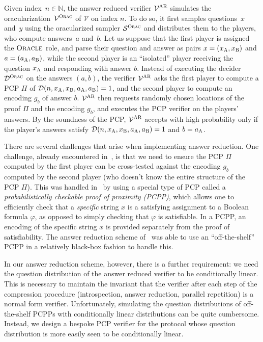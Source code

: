\documentclass[11pt]{article}
\theoremstyle{definition}
\newcommand{\N}{\ensuremath{\mathbb{N}}}
\newcommand{\sampler}{\mathcal{S}}
\newcommand{\decider}{\mathcal{D}}
\newcommand{\verifier}{\mathcal{V}}
\newcommand{\gamestyle}[1]{\ensuremath{\textsc{#1}}\xspace}
\newcommand{\ora}{\gamestyle{Orac}}
\newcommand{\ar}{\gamestyle{AR}}
\newcommand{\labelstyle}[1]{\ensuremath{\textsc{#1}}\xspace}
\newcommand{\alice}{\labelstyle{A}}
\newcommand{\bob}{\labelstyle{B}}
\newcommand{\oracle}{\labelstyle{Oracle}}
\begin{document}
Given index~$n \in \N$, the answer reduced verifier $\verifier^\ar$ simulates
the oracularization~$\verifier^\ora$ of $\verifier$ on index $n$.
To do so, it first samples questions~$x$ and~$y$ using the oracularized sampler
$\sampler^\ora$ and distributes them to the players, who compute answers~$a$
and~$b$.
Let us suppose that the first player is assigned the $\oracle$ role, and parse
their question and answer as pairs $x = (x_\alice, x_\bob)$ and $a = (a_\alice,
a_\bob)$, while the second player is an ``isolated'' player receiving the
question $x_\alice$ and responding with answer $b$.
Instead of executing the decider $\decider^\ora$ on the answers $(a, b)$, the
verifier $\verifier^\ar$ asks the first player to compute a PCP $\Pi$ of
$\decider(n, x_\alice, x_\bob, a_\alice, a_\bob) = 1$, and the second player to
compute an encoding $g_b$ of answer $b$.
$\verifier^\ar$ then requests randomly chosen locations of the proof $\Pi$ and
the encoding $g_b$, and executes the PCP verifier on the players' answers.
By the soundness of the PCP, $\verifier^\ar$ accepts with high probability only
if the player's answers satisfy $\decider(n, x_\alice, x_\bob, a_\alice, a_\bob)
= 1$ and $b = a_\alice$.

There are several challenges that arise when implementing answer reduction.
One challenge, already encountered in~\cite{NW19}, is that we need to ensure the
PCP $\Pi$ computed by the first player can be cross-tested against the encoding
$g_b$ computed by the second player (who doesn't know the entire structure of
the PCP $\Pi$).
This was handled in~\cite{NW19} by using a special type of PCP called a
\emph{probabilistically checkable proof of proximity (PCPP)}, which allows one
to efficiently check that a \emph{specific} string $x$ is a satisfying
assignment to a Boolean formula $\varphi$, as opposed to simply checking that
$\varphi$ is satisfiable.
In a PCPP, an encoding of the specific string $x$ is provided separately from
the proof of satisfiability.
The answer reduction scheme of~\cite{NW19} was able to use an ``off-the-shelf''
PCPP in a relatively black-box fashion to handle this.

In our answer reduction scheme, however, there is a further requirement: we need
the question distribution of the answer reduced verifier to be conditionally
linear.
This is necessary to maintain the invariant that the verifier after each step of
the compression procedure (introspection, answer reduction, parallel repetition)
is a normal form verifier.
Unfortunately, simulating the question distributions of off-the-shelf PCPPs with
conditionally linear distributions can be quite cumbersome.
Instead, we design a bespoke PCP verifier for the protocol whose question
distribution is more easily seen to be conditionally linear.
\end{document}
